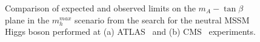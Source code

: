 \begin{figure}[!hp]
     \begin{center}
	
    \end{center}
    \caption{Comparison of expected and observed limits on the $m_A - \tan\beta$ plane in the $m_h^{max}$ scenario from
	 the search for the neutral MSSM Higgs boson performed at (a) ATLAS~\cite{yuppy} 
	and (b) CMS~\cite{CMSLimit} experiments.} 
   \label{fig:limitcomparisons}
\end{figure}





